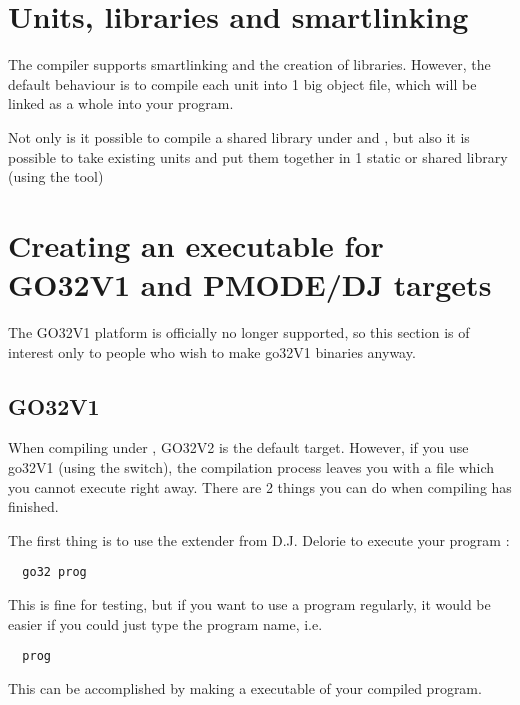 \section{Units, libraries and smartlinking}
The \fpc compiler supports smartlinking and the creation of libraries.
However, the default behaviour is to compile each unit into 1 big object
file, which will be linked as a whole into your program.

Not only is it possible to compile a shared library under \windows and
\linux, but also it is possible to take existing units and put them
together in 1 static or shared library (using the  tool)

\section{Creating an executable for GO32V1 and PMODE/DJ targets}
\label{go32v1}

The GO32V1 platform is officially no longer supported, so this section
is of interest only to people who wish to make go32V1 binaries anyway.

%
%
\subsection{GO32V1}
When compiling under \dos, GO32V2 is the default target. However, if you use
go32V1 (using the  switch), the
compilation process leaves you with a file which you cannot execute right away.
There are 2 things you can do when compiling has finished.

The first thing is to use the \dos extender from D.J. Delorie to execute
your program :
\begin{verbatim}
  go32 prog
\end{verbatim}
This is fine for testing, but if you want to use a program regularly, it
would be easier if you could just type the program name, i.e.
\begin{verbatim}
  prog
\end{verbatim}
This can be accomplished by making a \dos executable of your compiled program.

